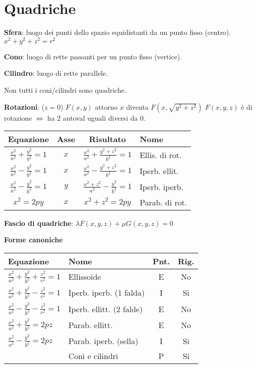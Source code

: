 \section{Quadriche}

\textbf{Sfera}: luogo dei punti dello spazio equidistanti da un punto fisso (centro). $x^2+y^2+z^2=r^2$

\textbf{Cono}: luogo di rette passanti per un punto fisso (vertice).

\textbf{Cilindro}: luogo di rette parallele.

Non tutti i coni/cilindri sono quadriche.

\textbf{Rotazioni}: ($z = 0$) $F(x, y)$ attorno $x$ diventa $F(x, \sqrt{y^2+z^2})$
$F(x,y,z)$ è di rotazione $\iff$ ha 2 autoval uguali diversi da 0.

\begin{tabular}{cccl}
	\textbf{Equazione} & \textbf{Asse} & \textbf{Risultato} & \textbf{Nome} \\
	\hline
	$\frac{x^2}{a^2}+\frac{y^2}{b^2}=1$ & $x$ & $\frac{x^2}{a^2}+\frac{y^2+z^2}{b^2}=1$ & Ellis. di rot. \\
	$\frac{x^2}{a^2}-\frac{y^2}{b^2}=1$ & $x$ & $\frac{x^2}{a^2}-\frac{y^2+z^2}{b^2}=1$ & Iperb. ellit. \\
	$\frac{x^2}{a^2}-\frac{y^2}{b^2}=1$ & $y$ & $\frac{x^2+z^2}{a^2}-\frac{y^2}{b^2}=1$ & Iperb. iperb. \\
	$x^2=2py$ & $x$ & $x^2+z^2=2py$ & Parab. di rot.
\end{tabular}

\textbf{Fascio di quadriche}: $\lambda F(x, y, z) + \mu G(x, y, z) = 0$

\textbf{Forme canoniche}
\begin{tabular}{llcc}
	\textbf{Equazione} & \textbf{Nome} & \textbf{Pnt.} & \textbf{Rig.} \\
	\hline
	$\frac{x^2}{a^2} + \frac{y^2}{b^2} + \frac{z^2}{c^2} = 1$ & Ellissoide & E & No \\
	$\frac{x^2}{a^2} + \frac{y^2}{b^2} - \frac{z^2}{c^2} = 1$ & Iperb. iperb. (1 falda) & I & Si \\
	$\frac{x^2}{a^2} - \frac{y^2}{b^2} - \frac{z^2}{c^2} = 1$ & Iperb. ellitt. (2 falde) & E & No \\
	$\frac{x^2}{a^2} + \frac{y^2}{b^2} = 2pz$ & Parab. ellitt. & E & No \\
	$\frac{x^2}{a^2} - \frac{y^2}{b^2} = 2pz$ & Parab. iperb. (sella) & I & Si \\
	 & Coni e cilindri & P & Si \\
\end{tabular}

